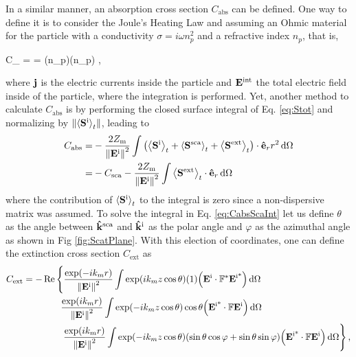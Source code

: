 In a similar manner, an absorption cross section $C_\text{abs}$ can be defined. One way to define it is to consider the Joule's Heating Law \cite{tsang_scattering_2000} and assuming an Ohmic material for the particle with a conductivity $\sigma = i\omega n_p^2$ \cite{jackson_classical_1999} and a refractive index $n_p$, that is,
%
\begin{tcolorbox}[title = Absorption Cross Section,	ams align, breakable]
C_ = \int {}
			= \int\omega \Re(n_p)\Im(n_p)  ,
			\label{eq:Cabs}
\end{tcolorbox}
%
where  $\vb{j}$ is the electric currents inside the particle and $\vb{E}^\text{int}$ the total electric field inside of the particle, where the integration is performed. Yet, another method to calculate $C_\text{abs}$ is by performing the closed surface integral of Eq. \eqref{eq:Stot} and normalizing by $\norm{\ev{\vb{S}^\text{i}}_t}$, leading to
%
\begin{align}
C_\text{abs} = & - \frac{2Z_\text{m}}{\norm{\vb{E}^\text{i}}^2}\int\qty(\ev{\vb{S}^\text{i}}_t + \ev{\vb{S}^\text{sca}}_t + \ev{\vb{S}^\text{ext}}_t)\cdot\vu{e}_rr^2\dd{\Omega} 
					\notag \\
			=  & - C_\text{sca} - \frac{2Z_\text{m}}{\norm{\vb{E}^\text{i}}^2}\int   \ev{\vb{S}^\text{ext}}_t\cdot \vu{e}_r\dd{\Omega}
\label{eq:CabsScaInt}
\end{align}
%
where the contribution of $\ev{\vb{S}^\text{i}}_t$ to the integral is zero since a non-dispersive matrix was assumed. To solve the integral in Eq. \eqref{eq:CabsScaInt} let us define $\theta$ as the angle between $\vu{k}^\text{sca}$ and $\vu{k}^\text{i}$ as the polar angle  and  $\varphi$ as the azimuthal angle as shown in Fig \ref{fig:ScatPlane}. With this election of coordinates, one can define the extinction cross section $C_\text{ext}$ as
%
\begin{align}
C_\text{ext} = - &\Re \left\{  
			 \frac{\exp(-ik_mr) }{\norm{\vb{E}^\text{i}}^2}\int \exp(ik_mz\cos\theta)(1)\qty(\vb{E}^\text{i}\cdot \mathbb{F}^*\vb{E}^\text{i*})  \dd{\Omega} \right.	\notag\\
			&\hspace*{2em}\frac{\exp(ik_mr) }{\norm{\vb{E}^\text{i}}^2}\int \exp(-ik_mz\cos\theta)\cos\theta \qty(\vb{E}^\text{i*}\cdot \mathbb{F}\vb{E}^\text{i})     \dd{\Omega} 	\notag\\
			&\hspace*{2em}\left.\frac{\exp(ik_mr) }{\norm{\vb{E}^\text{i}}^2} \int \exp(-ik_mz\cos\theta)(\sin\theta\cos\varphi+\sin\theta\sin\varphi) \qty(\vb{E}^\text{i*}\cdot \mathbb{F}\vb{E}^\text{i})    \dd{\Omega}  \right\},
\label{eq:CextFull}
\end{align}
